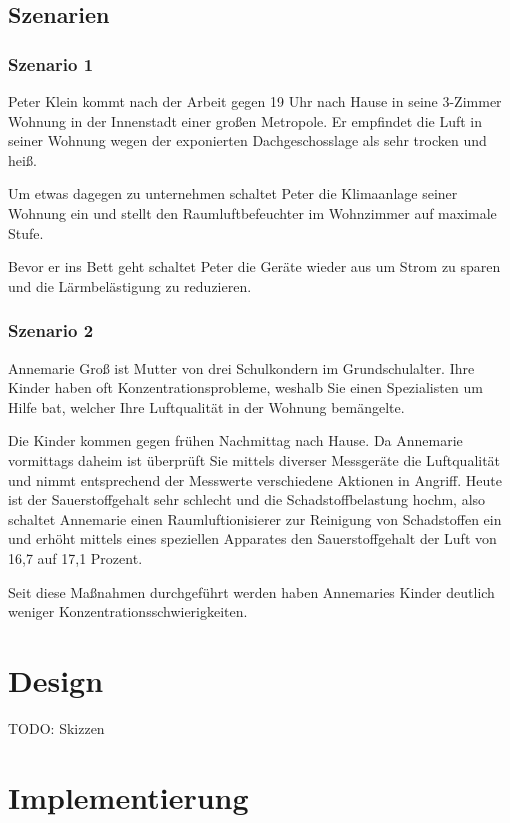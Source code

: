 \documentclass[a4paper,10pt]{article}
\begin{document}
\subsection{Szenarien}

\subsubsection{Szenario 1}
Peter Klein kommt nach der Arbeit gegen 19 Uhr nach Hause in seine 3-Zimmer Wohnung in der Innenstadt einer großen Metropole. Er empfindet die Luft in seiner Wohnung wegen der exponierten Dachgeschosslage als sehr trocken und heiß.

Um etwas dagegen zu unternehmen schaltet Peter die Klimaanlage seiner Wohnung ein und stellt den Raumluftbefeuchter im Wohnzimmer auf maximale Stufe.

Bevor er ins Bett geht schaltet Peter die Geräte wieder aus um Strom zu sparen und die Lärmbelästigung zu reduzieren.

\subsubsection{Szenario 2}
Annemarie Groß ist Mutter von drei Schulkondern im Grundschulalter. Ihre Kinder haben oft Konzentrationsprobleme, weshalb Sie einen Spezialisten um Hilfe bat, welcher Ihre Luftqualität in der Wohnung bemängelte.

Die Kinder kommen gegen frühen Nachmittag nach Hause. Da Annemarie vormittags daheim ist überprüft Sie mittels diverser Messgeräte die Luftqualität und nimmt entsprechend der Messwerte verschiedene Aktionen in Angriff. Heute ist der Sauerstoffgehalt sehr schlecht und die Schadstoffbelastung hochm, also schaltet Annemarie einen Raumluftionisierer zur Reinigung von Schadstoffen ein und erhöht mittels eines speziellen Apparates den Sauerstoffgehalt der Luft von 16,7 auf 17,1 Prozent.

Seit diese Maßnahmen durchgeführt werden haben Annemaries Kinder deutlich weniger Konzentrationsschwierigkeiten.

\section{Design}

TODO: Skizzen

\section{Implementierung}
\end{document}
